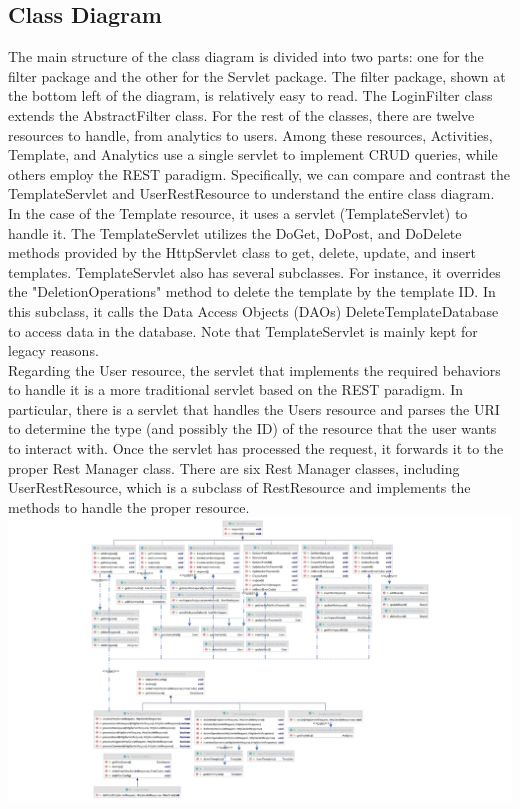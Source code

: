 \subsection{Class Diagram}


The main structure of the class diagram is divided into two parts: one for the filter package and the other for the Servlet package. The filter package, shown at the bottom left of the diagram, is relatively easy to read. The LoginFilter class extends the AbstractFilter class. For the rest of the classes, there are twelve resources to handle, from analytics to users. Among these resources, Activities, Template, and Analytics use a single servlet to implement CRUD queries, while others employ the REST paradigm. Specifically, we can compare and contrast the TemplateServlet and UserRestResource to understand the entire class diagram.\\

In the case of the Template resource, it uses a servlet (TemplateServlet) to handle it. The TemplateServlet utilizes the DoGet, DoPost, and DoDelete methods provided by the HttpServlet class to get, delete, update, and insert templates. TemplateServlet also has several subclasses. For instance, it overrides the "DeletionOperations" method to delete the template by the template ID. In this subclass, it calls the Data Access Objects (DAOs) DeleteTemplateDatabase to access data in the database. Note that TemplateServlet is mainly kept for legacy reasons.\\

Regarding the User resource, the servlet that implements the required behaviors to handle it is a more traditional servlet based on the REST paradigm. In particular, there is a servlet that handles the Users resource and parses the URI to determine the type (and possibly the ID) of the resource that the user wants to interact with. Once the servlet has processed the request, it forwards it to the proper Rest Manager class. There are six Rest Manager classes, including UserRestResource, which is a subclass of RestResource and implements the methods to handle the proper resource.\\
\includegraphics[width=1.30\columnwidth]{images/class sequence.jpg}\\


